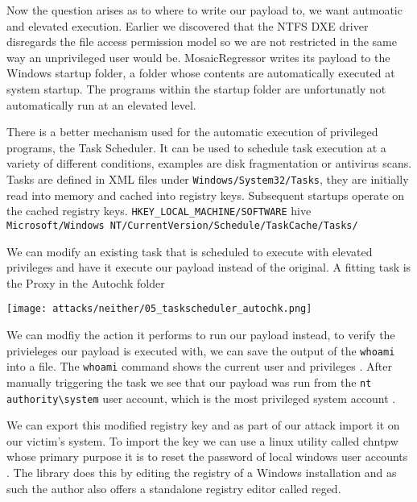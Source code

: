 Now the question arises as to where to write our payload to, we want autmoatic and elevated execution. Earlier we discovered that the NTFS DXE driver disregards the file access permission model so we are not restricted in the same way an unprivileged user would be. MosaicRegressor writes its payload to the Windows startup folder, a folder whose contents are automatically executed at system startup. The programs within the startup folder are unfortunatly not automatically run at an elevated level.



There is a better mechanism used for the automatic execution of privileged programs, the Task Scheduler. It can be used to schedule task execution at a variety of different conditions, examples are disk fragmentation or antivirus scans.
Tasks are defined in XML files under \lstinline{Windows/System32/Tasks}, they are initially read into memory and cached into registry keys. Subsequent startups operate on the cached registry keys.
\lstinline{HKEY_LOCAL_MACHINE/SOFTWARE} hive
\lstinline{Microsoft/Windows NT/CurrentVersion/Schedule/TaskCache/Tasks/}

\cite{windows-internals-7-part2}

We can modify an existing task that is scheduled to execute with elevated privileges and have it execute our payload instead of the original. A fitting task is the Proxy in the Autochk folder

\texttt{[image: attacks/neither/05\_taskscheduler\_autochk.png]}

We can modfiy the action it performs to run our payload instead, to verify the privieleges our payload is executed with, we can save the output of the \lstinline{whoami} into a file. The \lstinline{whoami} command shows the current user and privileges \cite{windows-whoami}. After manually triggering the task we see that our payload was run from the \lstinline{nt authority\system} user account, which is the most privileged system account \cite{microsoft-localsystem-account}.

We can export this modified registry key and as part of our attack import it on our victim's system. To import the key we can use a linux utility called chntpw whose primary purpose it is to reset the password of local windows user accounts \cite{chntpw}. The library does this by editing the registry of a Windows installation and as such the author also offers a standalone registry editor called reged.

